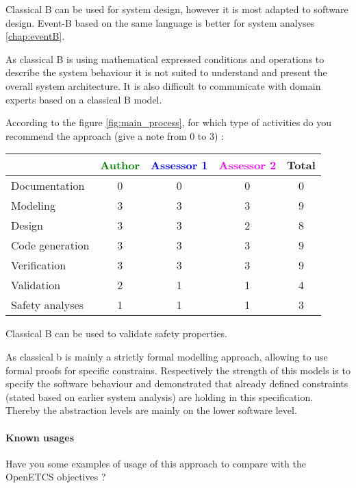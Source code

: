 \begin{author_comment}
Classical B can be used for system design, however it is most adapted to software design. Event-B  based on the same language is better for system analyses \ref{chap:eventB}.
\end{author_comment}


\begin{assessor2}
As classical B is using mathematical expressed conditions and operations to describe the system behaviour it is not suited to understand and present the overall system architecture. It is also difficult to communicate with domain experts based on a classical B model.
\end{assessor2}

According to the figure \ref{fig:main_process}, for which type of activities do you recommend the approach (give a note from 0 to  3) :

\begin{tabular}{|l | c | c | c | c|}
\hline
& \textcolor{green}{Author} & \textcolor{blue}{Assessor 1} & \textcolor{magenta}{Assessor 2} & Total \\
\hline 
Documentation & 0 & 0 & 0 & 0 \\
\hline
Modeling & 3 & 3 & 3 & 9 \\
\hline
Design & 3 & 3 & 2 & 8 \\
\hline
Code generation & 3 & 3 & 3 & 9 \\
\hline
Verification & 3 & 3 & 3 & 9 \\
\hline
Validation & 2 & 1 & 1 & 4 \\
\hline
Safety analyses & 1 & 1 & 1 & 3 \\
\hline
\end{tabular}


\begin{author_comment}
Classical B  can be used to  validate safety properties.
\end{author_comment}

\begin{assessor2}
As classical b is mainly a strictly formal modelling approach, allowing to use formal proofs for specific constrains. Respectively the strength of this models is to specify the software behaviour and demonstrated that already defined constraints (stated based on earlier system analysis) are holding in this specification. Thereby the abstraction levels are mainly on the lower software level.
\end{assessor2}

\paragraph{Known usages} Have you some examples of usage of this approach to  compare with the OpenETCS objectives ?

